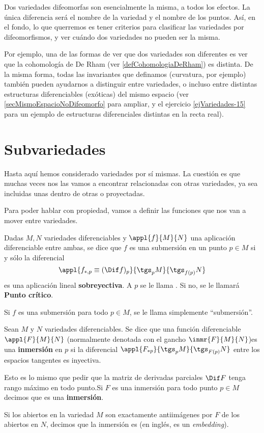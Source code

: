 Dos variedades difeomorfas son esencialmente la misma, a todos los efectos. La única diferencia será el nombre de la variedad y el nombre de los puntos. Así, en el fondo, lo que querremos es tener criterios para clasificar las variedades por difeomorfismos, y ver cuándo dos variedades no pueden ser la misma.

Por ejemplo, una de las formas de ver que dos variedades son diferentes es ver que la cohomología de De Rham (ver \ref{defCohomologiaDeRham}) es distinta. De la misma forma, todas las invariantes que definamos (curvatura, por ejemplo) también pueden ayudarnos a distinguir entre variedades, o incluso entre distintas estructuras diferenciables (exóticas) del mismo espacio (ver \ref{secMismoEspacioNoDifeomorfo} para ampliar, y el ejercicio \ref{ejVariedades-15} para un ejemplo de estructuras diferenciales distintas en la recta real).


\section{Subvariedades}

Hasta aquí hemos considerado variedades por sí mismas. La cuestión es que muchas veces nos las vamos a encontrar relacionadas con otras variedades, ya sea incluidas unas dentro de otras o proyectadas.

Para poder hablar con propiedad, vamos a definir las funciones que nos van a mover entre variedades.

\begin{defn}[Submersión] Dadas $M,N$ variedades diferenciables y $\appl{f}{M}{N}$ una aplicación diferenciable entre ambas, se dice que $f$ es una submersión en un punto $p ∈ M$ si y sólo la diferencial \[ \appl{f_{*,p} \equiv (\Dif f)_p}{\tgs_p M}{\tgs_{f(p)}N} \] es una aplicación lineal \textbf{sobreyectiva}. A $p$ se le llama . Si no, se le llamará \textbf{Punto crítico}.

Si $f$ es una submersión para todo $p∈M$, se le llama simplemente ``submersión''.
\end{defn}

\begin{defn}[Inmersión]\label{defInmersion} Sean $M$ y $N$ variedades diferenciables. Se dice que una función diferenciable $\appl{F}{M}{N}$ (normalmente denotada con el gancho $\inmr{F}{M}{N}$)es una \textbf{inmersión} en $p$ si la diferencial $\appl{F_{*p}}{\tgs_pM}{\tgs_{F(p)}N}$ entre los espacios tangentes es inyectiva.

Esto es lo mismo que pedir que la matriz de derivadas parciales $\Dif F$ tenga rango máximo en todo punto.Si $F$ es una inmersión para todo punto $p\in M$ decimos que es una \textbf{inmersión}.

Si los abiertos en la variedad $M$ son exactamente antiimágenes por $F$ de los abiertos en $N$, decimos que la inmersión es  (en inglés, es un \textit{embedding}).
\end{defn}

